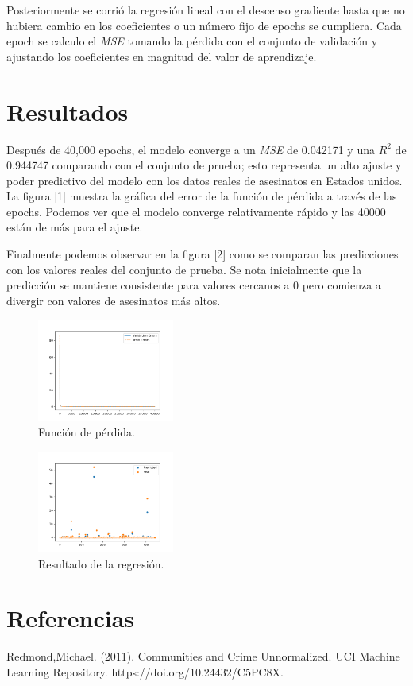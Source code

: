 \documentclass[twocolumn]{article}
\begin{document}
Posteriormente se corrió la regresión lineal con el descenso gradiente hasta que 
no hubiera cambio en los coeficientes o un número fijo de epochs se cumpliera. 
Cada epoch se calculo el \textit{MSE} tomando la pérdida con el conjunto de validación
y ajustando los coeficientes en magnitud del valor de aprendizaje.

\section{Resultados}
Después de 40,000 epochs, el modelo converge a un \textit{MSE} de 0.042171 y 
una \(R^2\) de 0.944747 comparando con el conjunto de prueba; esto representa un 
alto ajuste y poder predictivo del modelo con los datos reales de asesinatos en Estados unidos.
La figura [1] muestra la gráfica del error de la función de pérdida a través de las epochs.
Podemos ver que el modelo converge relativamente rápido y las 40000 están de más para el ajuste.

Finalmente podemos observar en la figura [2] como se comparan las predicciones con
los valores reales del conjunto de prueba. Se nota inicialmente que la predicción
se mantiene consistente para valores cercanos a 0 pero comienza a divergir con valores
de asesinatos más altos.

\begin{figure}
\centering
\includegraphics[width=0.4\textwidth]{assets/error.png}
\caption{\label{fig:dc1}Función de pérdida.}
\end{figure}

\begin{figure}
\centering
\includegraphics[width=0.4\textwidth]{assets/preds.png}
\caption{\label{fig:dc2}Resultado de la regresión.}
\end{figure}

\section*{Referencias}
Redmond,Michael. (2011). Communities and Crime Unnormalized. 
UCI Machine Learning Repository. https://doi.org/10.24432/C5PC8X.
\end{document}
